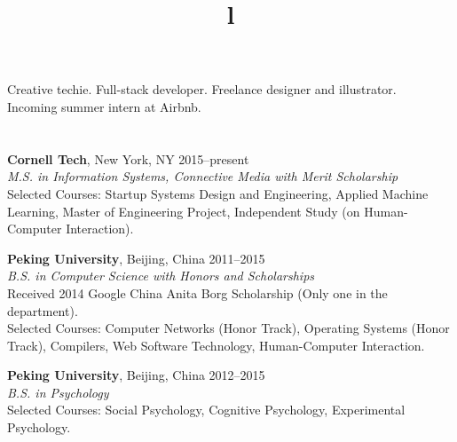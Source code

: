 \begin{resume}

\vspace{25pt}

\section{}

Creative techie. Full-stack developer. Freelance designer and illustrator. \\
Incoming summer intern at Airbnb.


\section{}

\textbf{Cornell Tech}, New York, NY \hfill 2015--present \\
\textsl{M.S. in Information Systems, Connective Media with Merit Scholarship} \\
Selected Courses: Startup Systems Design and Engineering, Applied Machine Learning, Master of Engineering Project, Independent Study (on Human-Computer Interaction).

\textbf{Peking University}, Beijing, China \hfill 2011--2015 \\ 
\textsl{B.S. in Computer Science with Honors and Scholarships}\\
Received 2014 Google China Anita Borg Scholarship (Only one in the department). \\
Selected Courses: Computer Networks (Honor Track), Operating Systems (Honor Track), Compilers, Web Software Technology, Human-Computer Interaction.

\textbf{Peking University}, Beijing, China \hfill 2012--2015 \\ 
\textsl{B.S. in Psychology}\\
Selected Courses: Social Psychology, Cognitive Psychology, Experimental Psychology.

\begin{formatb}
  \\
  \title{l}\\
  \body\\
\end{formatb}


\section{}


\end{resume}

